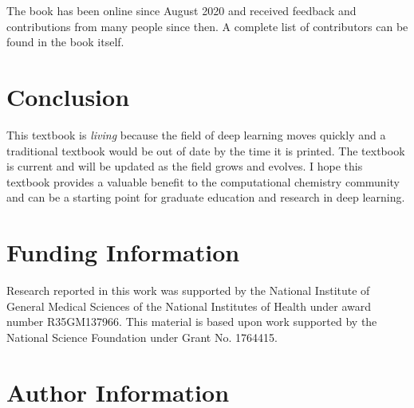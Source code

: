 \documentclass[9pt,pubversion,training]{livecoms}
\begin{document}
The book has been online since August 2020 and received feedback and contributions from many people since then.  A complete list of contributors can be found in the book itself.

\section{Conclusion}

This textbook is \textit{living} because the field of deep learning moves quickly and a traditional textbook would be out of date by the time it is printed. The textbook is current and will be updated as the field grows and evolves. I hope this textbook provides a valuable benefit to the computational chemistry community and can be a starting point for graduate education and research in deep learning.



\section*{Funding Information}

Research reported in this work was supported by the National Institute of General Medical Sciences of the National Institutes of Health under award number R35GM137966. This material is based upon work supported by the National Science Foundation under Grant No. 1764415.

\section*{Author Information}
\makeorcid


\end{document}

